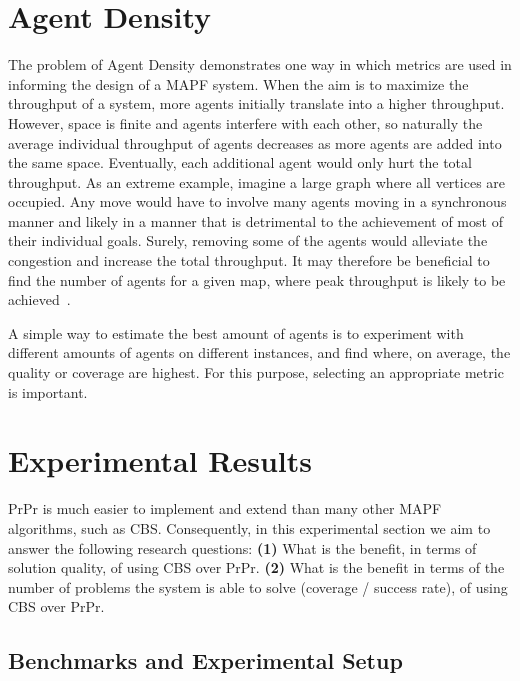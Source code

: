 \documentclass{article}
\newcommand{\sr}{Subset Reroute\xspace}
\newcommand{\ad}{Agent Density\xspace}
\begin{document}
\section{\ad}

The problem of \ad demonstrates one way in which metrics are used in informing the design of a MAPF system. When the aim is to maximize the throughput of a system, more agents initially translate into a higher throughput. However, space is finite and agents interfere with each other, so naturally the average individual throughput of agents decreases as more agents are added into the same space. Eventually, each additional agent would only hurt the total throughput. As an extreme example, imagine a large graph where all vertices are occupied. Any move would have to involve many agents moving in a synchronous manner and likely in a manner that is detrimental to the achievement of most of their individual goals. Surely, removing some of the agents would alleviate the congestion and increase the total throughput. It may therefore be beneficial to find the number of agents for a given map, where peak throughput is likely to be achieved~\cite{salzman2020research}. 

A simple way to estimate the best amount of agents is to experiment with different amounts of agents on different instances, and find where, on average, the quality or coverage are highest. For this purpose, selecting an appropriate metric is important.


\section{Experimental Results}

\begin{table}[t] 
\small
\centering

\caption{Comparison of different \sr versions}
\label{tbl:sr}
\end{table}

PrPr is much easier to implement and extend than many other MAPF algorithms, such as CBS. Consequently, in this experimental section we aim to answer the following research questions: 
\textbf{(1)} What is the benefit, in terms of solution quality, of using CBS over PrPr. 
\textbf{(2)} What is the benefit in terms of the number of problems the system is able to solve (coverage / success rate), of using CBS over PrPr.

\subsection{Benchmarks and Experimental Setup}
\end{document}
